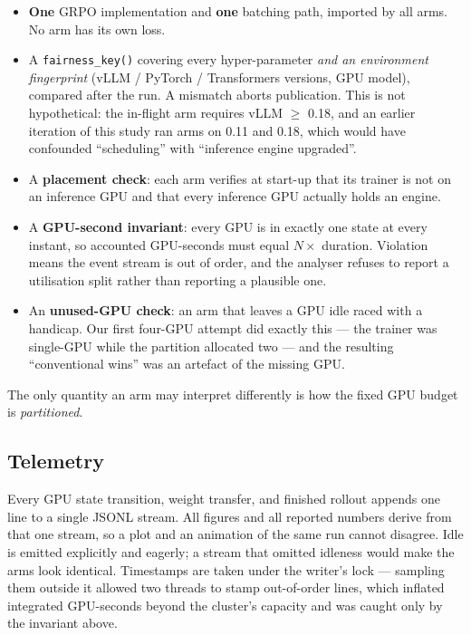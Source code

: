 \documentclass[11pt]{article}
\begin{document}
\begin{itemize}
\item \textbf{One} GRPO implementation and \textbf{one} batching path, imported by all arms.
No arm has its own loss.
\item A \texttt{fairness\_key()} covering every hyper-parameter \emph{and an environment
fingerprint} (vLLM / PyTorch / Transformers versions, GPU model), compared after the run. A
mismatch aborts publication. This is not hypothetical: the in-flight arm requires
vLLM $\geq$ 0.18, and an earlier iteration of this study ran arms on 0.11 and 0.18, which
would have confounded ``scheduling'' with ``inference engine upgraded''.
\item A \textbf{placement check}: each arm verifies at start-up that its trainer is not on an
inference GPU and that every inference GPU actually holds an engine.
\item A \textbf{GPU-second invariant}: every GPU is in exactly one state at every instant, so
accounted GPU-seconds must equal $N \times$ duration. Violation means the event stream is
out of order, and the analyser refuses to report a utilisation split rather than reporting a
plausible one.
\item An \textbf{unused-GPU check}: an arm that leaves a GPU idle raced with a handicap. Our
first four-GPU attempt did exactly this --- the trainer was single-GPU while the partition
allocated two --- and the resulting ``conventional wins'' was an artefact of the missing GPU.
\end{itemize}

The only quantity an arm may interpret differently is how the fixed GPU budget is
\emph{partitioned}.

\subsection{Telemetry}

Every GPU state transition, weight transfer, and finished rollout appends one line to a
single JSONL stream. All figures and all reported numbers derive from that one stream, so a
plot and an animation of the same run cannot disagree. Idle is emitted explicitly and
eagerly; a stream that omitted idleness would make the arms look identical. Timestamps are
taken under the writer's lock --- sampling them outside it allowed two threads to stamp
out-of-order lines, which inflated integrated GPU-seconds beyond the cluster's capacity and
was caught only by the invariant above.
\end{document}
